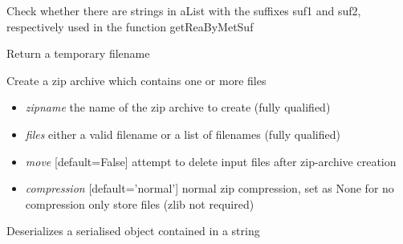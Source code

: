 \documentclass[a4paper,11pt,english]{sphinxmanual}
\begin{document}

\begin{fulllineitems}
\label{modules_doc:cbmpy.CBTools.checkSuffixes}
Check whether there are strings in aList with the suffixes suf1 and suf2, respectively
used in the function getReaByMetSuf

\end{fulllineitems}


\begin{fulllineitems}
\label{modules_doc:cbmpy.CBTools.createTempFileName}
Return a temporary filename

\end{fulllineitems}


\begin{fulllineitems}
\label{modules_doc:cbmpy.CBTools.createZipArchive}
Create a zip archive which contains one or more files
\begin{itemize}
\item {} 
\emph{zipname} the name of the zip archive to create (fully qualified)

\item {} 
\emph{files} either a valid filename or a list of filenames (fully qualified)

\item {} 
\emph{move} {[}default=False{]} attempt to delete input files after zip-archive creation

\item {} 
\emph{compression} {[}default='normal'{]} normal zip compression, set as None for no compression only store files (zlib not required)

\end{itemize}

\end{fulllineitems}


\begin{fulllineitems}
\label{modules_doc:cbmpy.CBTools.deSerialize}
Deserializes a serialised object contained in a string

\end{fulllineitems}
\end{document}
